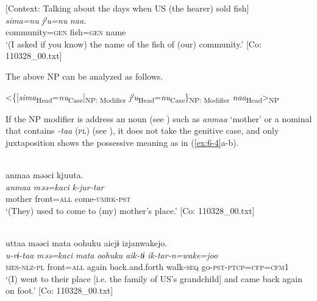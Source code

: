 \ea\label{ex:6-2}
   [Context: Talking about the days when US (the hearer) sold fish]\\
{\TM}
\gll \textit{sima=nu}  \textit{jˀu=nu}  \textit{naa.}\\
community=\textsc{gen}  fish=\textsc{gen}  name\\
\glt    ‘(I asked if you know) the name of the fish of (our) community.’ [Co: 110328\_00.txt]
\z

The above NP can be analyzed as follows.

\ea\label{ex:6-3}
 <\{[\textit{sima}\textsubscript{Head}=\textit{nu}\textsubscript{Case}]\textsubscript{NP: Modifier} \textit{jˀu}\textsubscript{Head}=\textit{nu}\textsubscript{Case}\}\textsubscript{NP: Modifier} \textit{naa}\textsubscript{Head}>\textsubscript{NP}
\z


If the NP modifier is address an noun (see ) such as \textit{anmaa} ‘mother’ or a nominal that contains \textit{-taa} (\textsc{pl}) (see ), it does not take the genitive case, and only juxtaposition shows the possessive meaning as in (\ref{ex:6-4}a-b).

\ea\label{ex:6-4}
\ea{}\\
{\TM}
\glll anmaa  məəci  kjuuta.\\
\textit{anmaa}  \textit{məə=kaci}  \textit{k-jur-tar}\\
mother  front=\textsc{all}  come-\textsc{umrk}-\textsc{pst}\\
\glt ‘(They) used to come to (my) mother’s place.’ [Co: 110328\_00.txt]

\ex{}\\
{\US}
\glll uttaa  məəci  mata  {\textbar}oohuku{\textbar}  aicjɨ                                                    izjanwakejo.                                            \\
      \textit{u-rɨ-taa}  \textit{məə=kaci}  \textit{mata}  \textit{oohuku}  \textit{aik-tɨ}                   \textit{ik-tar-n=wake=joo}                              \\
      \textsc{mes}-\textsc{nlz}-\textsc{pl}  front=\textsc{all}  again  back.and.forth  walk-\textsc{seq}     go-\textsc{pst}-\textsc{ptcp}=\textsc{cfp}=\textsc{cfm}1\\
\glt ‘(I) went to their place [i.e. the family of US’s grandchild] and came back again on foot.’ [Co: 110328\_00.txt]


